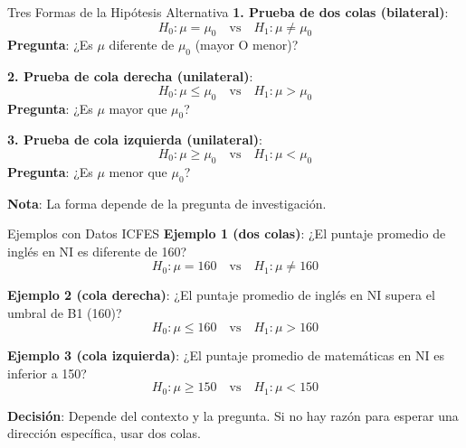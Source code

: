 \documentclass[aspectratio=169, 11pt]{beamer}
\begin{document}
\begin{frame}{Tres Formas de la Hipótesis Alternativa}
\textbf{1. Prueba de dos colas (bilateral)}:
\[
H_0: \mu = \mu_0 \quad \text{vs} \quad H_1: \mu \neq \mu_0
\]
\textbf{Pregunta}: ¿Es $\mu$ \alert{diferente} de $\mu_0$ (mayor O menor)?

\vspace{0.3cm}
\textbf{2. Prueba de cola derecha (unilateral)}:
\[
H_0: \mu \leq \mu_0 \quad \text{vs} \quad H_1: \mu > \mu_0
\]
\textbf{Pregunta}: ¿Es $\mu$ \alert{mayor} que $\mu_0$?

\vspace{0.3cm}
\textbf{3. Prueba de cola izquierda (unilateral)}:
\[
H_0: \mu \geq \mu_0 \quad \text{vs} \quad H_1: \mu < \mu_0
\]
\textbf{Pregunta}: ¿Es $\mu$ \alert{menor} que $\mu_0$?

\vspace{0.3cm}
\textbf{Nota}: La forma depende de la pregunta de investigación.
\end{frame}

\begin{frame}{Ejemplos con Datos ICFES}
\textbf{Ejemplo 1 (dos colas)}: ¿El puntaje promedio de inglés en NI es diferente de 160?
\[
H_0: \mu = 160 \quad \text{vs} \quad H_1: \mu \neq 160
\]

\vspace{0.3cm}
\textbf{Ejemplo 2 (cola derecha)}: ¿El puntaje promedio de inglés en NI supera el umbral de B1 (160)?
\[
H_0: \mu \leq 160 \quad \text{vs} \quad H_1: \mu > 160
\]

\vspace{0.3cm}
\textbf{Ejemplo 3 (cola izquierda)}: ¿El puntaje promedio de matemáticas en NI es inferior a 150?
\[
H_0: \mu \geq 150 \quad \text{vs} \quad H_1: \mu < 150
\]

\vspace{0.3cm}
\textbf{Decisión}: Depende del contexto y la pregunta. Si no hay razón para esperar una dirección específica, usar dos colas.
\end{frame}
\end{document}
